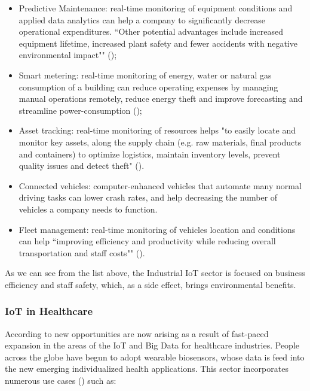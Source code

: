 \begin{itemize}
    \item Predictive Maintenance: real-time monitoring of equipment conditions and applied data analytics can help a company to significantly decrease operational expenditures. ``Other potential advantages include increased equipment lifetime, increased plant safety and fewer accidents with negative environmental impact"" (\cite{iiot-cases});
    \item Smart metering: real-time monitoring of energy, water or natural gas consumption of a building can reduce operating expenses by managing manual operations remotely, reduce energy theft and improve forecasting and streamline power-consumption (\cite{metering-sierra});
    \item Asset tracking: real-time monitoring of resources helps "to easily locate and monitor key assets, along the supply chain (e.g. raw materials, final products and containers) to optimize logistics, maintain inventory levels, prevent quality issues and detect theft" (\cite{iiot-cases}).
    \item Connected vehicles: computer-enhanced vehicles that automate many normal driving tasks can lower crash rates, and help decreasing the number of vehicles a company needs to function.
    \item Fleet management: real-time monitoring of vehicles location and conditions can help ``improving efficiency and productivity while reducing overall transportation and staff costs"" (\cite{iiot-cases}).
\end{itemize}

As we can see from the list above, the Industrial \gls{IoT} sector is focused on business efficiency and staff safety, which, as a side effect, brings environmental benefits.

\subsubsection{IoT in Healthcare}
\label{subsubsec:stateofart:iot:areas:healthcare}

According to \cite{FIROUZI2018583} new opportunities are now arising as a result of fast-paced expansion in the areas of the \gls{IoT} and Big Data for healthcare industries. People across the globe have begun to adopt wearable biosensors, whose data is feed into the new emerging individualized health applications.
This sector incorporates numerous use cases (\cite{iot-healthcare}) such as:

